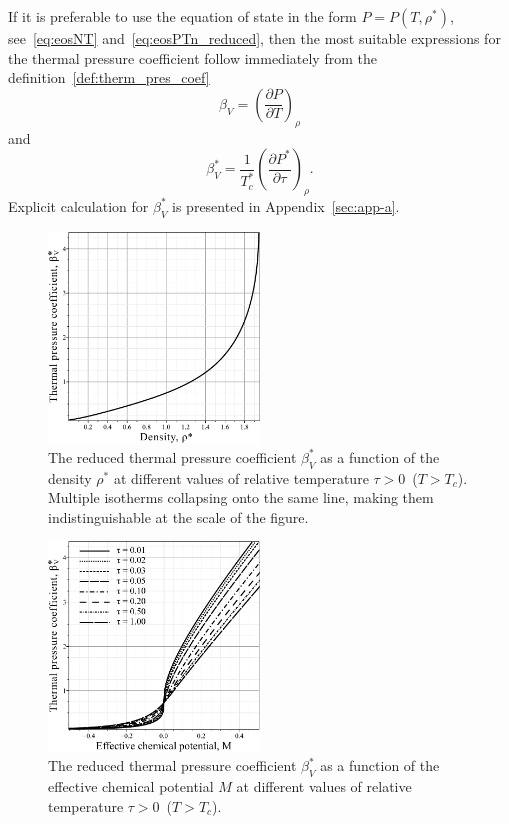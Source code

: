 If it is preferable to use the equation of state in the form $P=P(T, \rho^*)$, see~\eqref{eq:eosNT} and~\eqref{eq:eosPTn_reduced}, then the most suitable expressions for the thermal pressure coefficient follow immediately from the definition~\eqref{def:therm_pres_coef}
\begin{equation}
	\beta_V = \left(\frac{\partial P}{\partial T}\right)_\rho
\end{equation}
and
\begin{equation}
	\label{eq:beta_star_n}
	\beta^*_V = \frac{1}{T^*_c} \left(\frac{\partial P^*}{\partial \tau}\right)_{\rho}.
\end{equation}
Explicit calculation for $\beta^*_V$ is presented in Appendix~\ref{sec:app-a}.

\begin{figure}[h!] 
	\includegraphics[width=0.5\textwidth]{f3a.pdf}
	\vskip-3mm
	\caption{The reduced thermal pressure coefficient $\beta^*_V$ as a function of the density $\rho^*$ at different values of relative temperature $\tau > 0$~($T > T_c$). Multiple isotherms collapsing onto the same line, making them indistinguishable at the scale of the figure.
	}
	\label{fig3a}
\end{figure}
\begin{figure}[h!]
	\includegraphics[width=0.5\textwidth]{f3b.pdf}
	\vskip-3mm
	\caption{The reduced thermal pressure coefficient $\beta^*_V$ as a function of the effective chemical potential $M$ at different values of relative temperature $\tau > 0$~($T > T_c$). 
	}
	\label{fig3b}
\end{figure}
